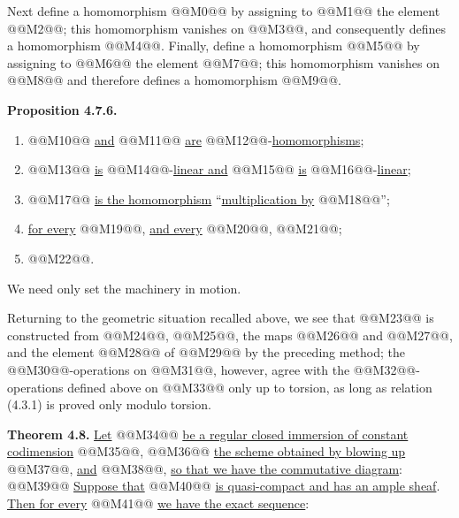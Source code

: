 Next define a homomorphism @@M0@@ by assigning to @@M1@@ the element @@M2@@; this homomorphism vanishes on @@M3@@, and consequently defines a homomorphism @@M4@@. Finally, define a homomorphism @@M5@@ by assigning to @@M6@@ the element @@M7@@; this homomorphism vanishes on @@M8@@ and therefore defines a homomorphism @@M9@@.

\textbf{Proposition 4.7.6.}
\begin{enumerate}[label=\roman*)]
\item @@M10@@ \uline{and} @@M11@@ \uline{are} @@M12@@-\uline{homomorphisms};
\item @@M13@@ \uline{is} @@M14@@-\uline{linear and} @@M15@@ \uline{is} @@M16@@-\uline{linear};
\item @@M17@@ \uline{is the homomorphism} ``\uline{multiplication by} @@M18@@'';
\item \uline{for every} @@M19@@, \uline{and every} @@M20@@, @@M21@@;
\item @@M22@@.
\end{enumerate}

We need only set the machinery in motion.

Returning to the geometric situation recalled above, we see that @@M23@@ is constructed from @@M24@@, @@M25@@, the maps @@M26@@ and @@M27@@, and the element @@M28@@ of @@M29@@ by the preceding method; the @@M30@@-operations on @@M31@@, however, agree with the @@M32@@-operations defined above on @@M33@@ only up to torsion, as long as relation (4.3.1) is proved only modulo torsion.

\textbf{Theorem 4.8.} \uline{Let} @@M34@@ \uline{be a regular closed immersion of constant codimension} @@M35@@, @@M36@@ \uline{the scheme obtained by blowing up} @@M37@@, \uline{and} @@M38@@, \uline{so that we have the commutative diagram}:
@@M39@@
\uline{Suppose that} @@M40@@ \uline{is quasi-compact and has an ample sheaf}. \uline{Then for every} @@M41@@ \uline{we have the exact sequence}:
